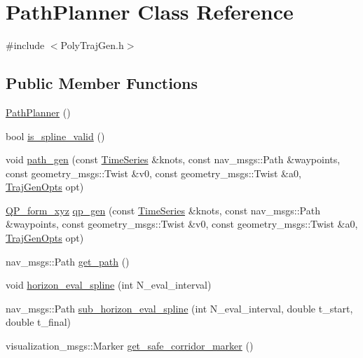 \hypertarget{class_path_planner}{}\section{Path\+Planner Class Reference}
\label{class_path_planner}


{\ttfamily \#include $<$Poly\+Traj\+Gen.\+h$>$}

\subsection*{Public Member Functions}
\begin{DoxyCompactItemize}
\item 
\hyperlink{class_path_planner_a376f30d795cfe0a40f8923f49336f7da}{Path\+Planner} ()
\item 
bool \hyperlink{class_path_planner_a58b48f13a0beefa08e584040d4e29bae}{is\+\_\+spline\+\_\+valid} ()
\item 
void \hyperlink{class_path_planner_a197058bceddd7a22cd23c74239562754}{path\+\_\+gen} (const \hyperlink{_poly_traj_gen_8h_a37d0493e73d8ef72a2405596ad6cee0c}{Time\+Series} \&knots, const nav\+\_\+msgs\+::\+Path \&waypoints, const geometry\+\_\+msgs\+::\+Twist \&v0, const geometry\+\_\+msgs\+::\+Twist \&a0, \hyperlink{struct_traj_gen_opts}{Traj\+Gen\+Opts} opt)
\item 
\hyperlink{struct_q_p__form__xyz}{Q\+P\+\_\+form\+\_\+xyz} \hyperlink{class_path_planner_a4b5f5beea2c380ae4340f65dd1d5bd10}{qp\+\_\+gen} (const \hyperlink{_poly_traj_gen_8h_a37d0493e73d8ef72a2405596ad6cee0c}{Time\+Series} \&knots, const nav\+\_\+msgs\+::\+Path \&waypoints, const geometry\+\_\+msgs\+::\+Twist \&v0, const geometry\+\_\+msgs\+::\+Twist \&a0, \hyperlink{struct_traj_gen_opts}{Traj\+Gen\+Opts} opt)
\item 
nav\+\_\+msgs\+::\+Path \hyperlink{class_path_planner_a36d08d3831066c76be5195ed99fa1f68}{get\+\_\+path} ()
\item 
void \hyperlink{class_path_planner_ad231acc2bce7d5e143fa49c69515c4a9}{horizon\+\_\+eval\+\_\+spline} (int N\+\_\+eval\+\_\+interval)
\item 
nav\+\_\+msgs\+::\+Path \hyperlink{class_path_planner_a85541c4c74f7b2b199d85c5739db51ad}{sub\+\_\+horizon\+\_\+eval\+\_\+spline} (int N\+\_\+eval\+\_\+interval, double t\+\_\+start, double t\+\_\+final)
\item 
visualization\+\_\+msgs\+::\+Marker \hyperlink{class_path_planner_aadd23ca1fbe79abb2a6fc6983fb3f639}{get\+\_\+safe\+\_\+corridor\+\_\+marker} ()

\end{DoxyCompactItemize}
